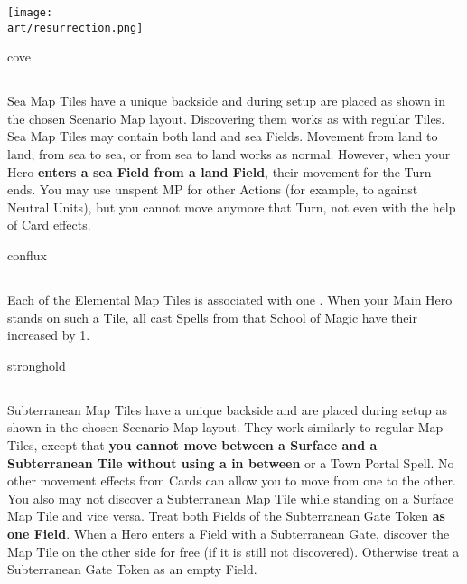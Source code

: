 \begin{multicols*}{2}
\vfill
\hspace{2em}
{\texttt{[image: \\art/resurrection.png]}}

\newpage

\begin{expansion}{cove}
  \subsection*{}
  Sea Map Tiles have a unique backside and during setup are placed as shown in the chosen Scenario Map layout.
  Discovering them works as with regular Tiles.
  Sea Map Tiles may contain both land and sea Fields.
  Movement from land to land, from sea to sea, or from sea to land works as normal.
  However, when your Hero \textbf{enters a sea Field from a land Field}, their movement for the Turn ends.
  You may use unspent MP for other Actions (for example, to  against Neutral Units), but you cannot move anymore that Turn, not even with the help of Card effects.
\end{expansion}

\bigskip

\begin{expansion}{conflux}
  \subsection*{}
  Each of the Elemental Map Tiles is associated with one .
  When your Main Hero stands on such a Tile, all cast Spells from that School of Magic have their  increased by 1.
\end{expansion}

\bigskip

\begin{expansion}{stronghold}
  \subsection*{}
  Subterranean Map Tiles have a unique backside and are placed during setup as shown in the chosen Scenario Map layout.
  They work similarly to regular Map Tiles, except that \textbf{you cannot move between a Surface and a Subterranean Tile without using a  in between} or a Town Portal Spell.
  No other movement effects from Cards can allow you to move from one to the other.
  You also may not discover a Subterranean Map Tile while standing on a Surface Map Tile and vice versa.
  Treat both Fields of the Subterranean Gate Token \textbf{as one Field}.
  When a Hero enters a Field with a Subterranean Gate, discover the Map Tile on the other side for free (if it is still not discovered).
  Otherwise treat a Subterranean Gate Token as an empty Field.
\end{expansion}


\end{multicols*}
